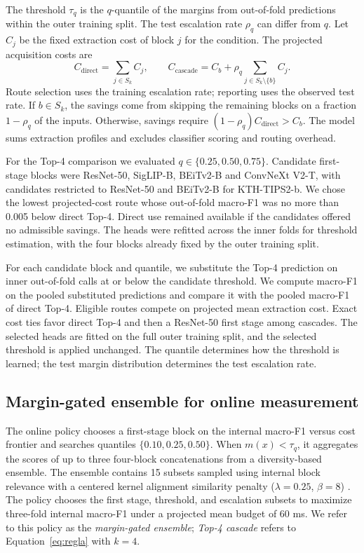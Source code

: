 \documentclass[10pt,a4paper,fleqn]{article}
\begin{document}
The threshold $\tau_q$ is the $q$-quantile of the margins from out-of-fold predictions within the outer training split. The test escalation rate $\rho_q$ can differ from $q$. Let $C_j$ be the fixed extraction cost of block $j$ for the condition. The projected acquisition costs are
\begin{equation}
 C_{\mathrm{direct}}=\sum_{j\in S_k} C_j,\qquad
 C_{\mathrm{cascade}}= C_b + \rho_q \sum_{j\in S_k\setminus\{b\}}C_j.
 \label{eq:costos}
\end{equation}
Route selection uses the training escalation rate; reporting uses the observed test rate. If $b\in S_k$, the savings come from skipping the remaining blocks on a fraction $1-\rho_q$ of the inputs. Otherwise, savings require $(1-\rho_q)C_{\mathrm{direct}}>C_b$. The model sums extraction profiles and excludes classifier scoring and routing overhead.

For the Top-4 comparison we evaluated $q\in\{0.25,0.50,0.75\}$. Candidate first-stage blocks were ResNet-50, SigLIP-B, BEiTv2-B and ConvNeXt V2-T, with candidates restricted to ResNet-50 and BEiTv2-B for KTH-TIPS2-b. We chose the lowest projected-cost route whose out-of-fold macro-F1 was no more than 0.005 below direct Top-4. Direct use remained available if the candidates offered no admissible savings. The heads were refitted across the inner folds for threshold estimation, with the four blocks already fixed by the outer training split.

For each candidate block and quantile, we substitute the Top-4 prediction on inner out-of-fold calls at or below the candidate threshold. We compute macro-F1 on the pooled substituted predictions and compare it with the pooled macro-F1 of direct Top-4. Eligible routes compete on projected mean extraction cost. Exact cost ties favor direct Top-4 and then a ResNet-50 first stage among cascades. The selected heads are fitted on the full outer training split, and the selected threshold is applied unchanged. The quantile determines how the threshold is learned; the test margin distribution determines the test escalation rate.


\subsection{Margin-gated ensemble for online measurement}\label{sec:variante-panel}

The online policy chooses a first-stage block on the internal macro-F1 versus cost frontier and searches quantiles $\{0.10,0.25,0.50\}$. When $m(x)<\tau_q$, it aggregates the scores of up to three four-block concatenations from a diversity-based ensemble. The ensemble contains 15 subsets sampled using internal block relevance with a centered kernel alignment similarity penalty ($\lambda=0.25$, $\beta=8$) \citep{kornblith2019similarity}. The policy chooses the first stage, threshold, and escalation subsets to maximize three-fold internal macro-F1 under a projected mean budget of 60 ms. We refer to this policy as the \emph{margin-gated ensemble}; \emph{Top-4 cascade} refers to Equation~\eqref{eq:regla} with $k=4$.
\end{document}
